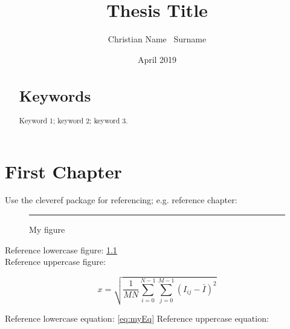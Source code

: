 \documentclass[12pt]{book}
\title{Thesis Title}
\author{Christian Name \ Surname}
\date{April 2019}
\begin{document}

\maketitlepages

\begin{abstract}
    \blindtext
    \section*{Keywords}
    Keyword 1; keyword 2; keyword 3.
\end{abstract}

\sstableofcontents

\sslistoffigures

\sslistoftables

\sslistofcode

\begin{listofabbreviations}
\end{listofabbreviations}

\begin{listofsymbols}
\end{listofsymbols}

\chapter{First Chapter}\label{chap:one}

Use the cleveref package for referencing; e.g. reference chapter: 

\begin{figure}[h!]
  \centering
  \rule{20pt}{20pt}
  \caption{My figure}
  \label{fig:myfig1}
\end{figure}

\noindent Reference lowercase figure: \cref{fig:myfig1}\\
\noindent Reference uppercase figure: 

\begin{equation} 
  x = \sqrt{\frac{1}{M N}\sum_{i=0}^{N-1}\sum_{j=0}^{M - 1}(I_{ij} - \bar{I})^2} \label{eq:myEq}
\end{equation}

\noindent Reference lowercase equation: \cref{eq:myEq}
\noindent Reference uppercase equation: 
\end{document}
